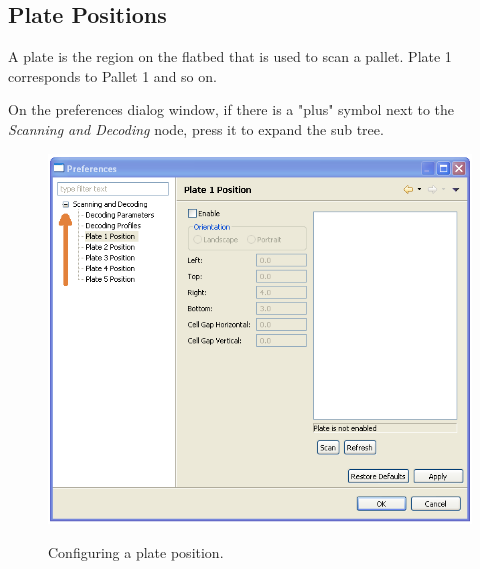 \subsection{Plate Positions}
\label{sec:plate_positions}
A plate is the region on the flatbed that is used to scan a pallet. Plate 1
corresponds to Pallet 1 and so on.

On the preferences dialog window, if there is a "plus" symbol next to the
\emph{Scanning and Decoding} node, press it to expand the sub tree.
    \begin{figure}[H]
      \centering
      \scalebox{0.5}
      { \includegraphics*{screenshots/configuration/plate1_definition} }
      \caption{Configuring a plate position.}
      \label{fig:plate1_definition}
    \end{figure}

